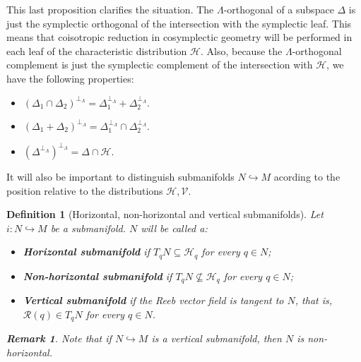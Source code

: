 \documentclass[12pt]{article}
\newtheorem{Def}{Definition}[section]
\newtheorem{remark}{Remark}[section]
\begin{document}
This last proposition clarifies the situation. The $\Lambda$-orthogonal of a subspace $\Delta$ is just the symplectic orthogonal of the intersection with the symplectic leaf. This means that coisotropic reduction in cosymplectic geometry will be performed in each leaf of the characteristic distribution $\mathcal{H}$. Also, because the $\Lambda$-orthogonal complement is just the symplectic complement of the intersection with $\mathcal{H}$, we have the following properties:
\begin{itemize}
\item[$i)$] $(\Delta_1 \cap \Delta_2)^{\perp_\Lambda} = \Delta_1^{\perp_\Lambda} + \Delta_2^{\perp_\Lambda}.$
\item[$ii)$] $(\Delta_1 + \Delta_2)^{\perp_\Lambda} = \Delta_1^{\perp_\Lambda} \cap \Delta_2^{\perp_\Lambda}.$
\item[$iii)$] $(\Delta^{\perp_\Lambda})^{\perp_\Lambda} = \Delta \cap \mathcal{H}.$
\end{itemize}

It will also be important to distinguish submanifolds $N \hookrightarrow M$ acording to the position relative to the distributions $\mathcal{H},\mathcal{V}$.\\
\begin{Def}[Horizontal, non-horizontal and vertical submanifolds] Let $i: N \hookrightarrow M$ be a submanifold. $N$ will be called a:
\begin{itemize}
\item[$i)$] \textbf{Horizontal submanifold} if $T_qN \subseteq \mathcal{H}_q$ for every $q \in N$;
\item[$ii)$] \textbf{Non-horizontal submanifold} if $T_qN \not \subseteq \mathcal{H}_q$ for every $q \in N$;
\item[$iii)$] \textbf{Vertical submanifold} if the Reeb vector field is tangent to $N$, that is, $\mathcal{R}(q) \in T_qN$ for every $q \in N$.\\
\end{itemize}

\begin{remark} {\rm Note that if $N\hookrightarrow M$ is a vertical submanifold, then $N$ is non-horizontal.}  
\end{remark}
\end{Def}
\end{document}
